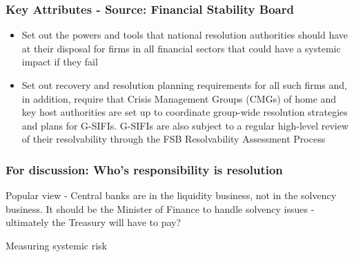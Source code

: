 \documentclass[11pt]{beamer}
\begin{document}
\begin{frame}
\frametitle{Key Attributes - Source: Financial Stability Board}
\begin{itemize}
\item Set out the powers and tools that national resolution authorities should have at their disposal for firms in all financial sectors that could have a systemic impact if they fail
\item Set out recovery and resolution planning requirements for all such firms and, in addition, require that Crisis Management Groups (CMGs) of home and key host authorities are set up to coordinate group-wide resolution strategies and plans for G-SIFIs. G-SIFIs are also subject to a regular high-level review of their resolvability through the FSB Resolvability Assessment Process
\end{itemize}
\end{frame}


\begin{frame}
\frametitle{For discussion: Who's responsibility is resolution}
Popular view - Central banks are in the liquidity business, not in the solvency business. It should be the Minister of Finance to handle solvency issues - ultimately the Treasury will have to pay?
\end{frame}







\begin{frame}
\begin{center}
Measuring systemic risk
\end{center}
\end{frame}
\end{document}
